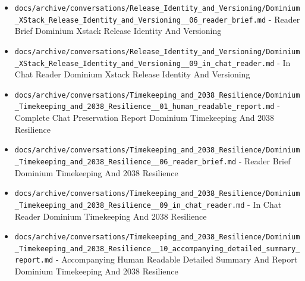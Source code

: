 \documentclass[10.5pt,a4paper,openany]{book}
\begin{document}
\begin{itemize}
\item \texttt{docs/\allowbreak{}archive/\allowbreak{}conversations/\allowbreak{}Release\_\allowbreak{}Identity\_\allowbreak{}and\_\allowbreak{}Versioning/\allowbreak{}Dominium\_\allowbreak{}XStack\_\allowbreak{}Release\_\allowbreak{}Identity\_\allowbreak{}and\_\allowbreak{}Versioning\_\allowbreak{}\_\allowbreak{}06\_\allowbreak{}reader\_\allowbreak{}brief.\allowbreak{}md} -\allowbreak{} Reader Brief Dominium Xstack Release Identity And Versioning
\item \texttt{docs/\allowbreak{}archive/\allowbreak{}conversations/\allowbreak{}Release\_\allowbreak{}Identity\_\allowbreak{}and\_\allowbreak{}Versioning/\allowbreak{}Dominium\_\allowbreak{}XStack\_\allowbreak{}Release\_\allowbreak{}Identity\_\allowbreak{}and\_\allowbreak{}Versioning\_\allowbreak{}\_\allowbreak{}09\_\allowbreak{}in\_\allowbreak{}chat\_\allowbreak{}reader.\allowbreak{}md} -\allowbreak{} In Chat Reader Dominium Xstack Release Identity And Versioning
\item \texttt{docs/\allowbreak{}archive/\allowbreak{}conversations/\allowbreak{}Timekeeping\_\allowbreak{}and\_\allowbreak{}2038\_\allowbreak{}Resilience/\allowbreak{}Dominium\_\allowbreak{}Timekeeping\_\allowbreak{}and\_\allowbreak{}2038\_\allowbreak{}Resilience\_\allowbreak{}\_\allowbreak{}01\_\allowbreak{}human\_\allowbreak{}readable\_\allowbreak{}report.\allowbreak{}md} -\allowbreak{} Complete Chat Preservation Report Dominium Timekeeping And 2038 Resilience
\item \texttt{docs/\allowbreak{}archive/\allowbreak{}conversations/\allowbreak{}Timekeeping\_\allowbreak{}and\_\allowbreak{}2038\_\allowbreak{}Resilience/\allowbreak{}Dominium\_\allowbreak{}Timekeeping\_\allowbreak{}and\_\allowbreak{}2038\_\allowbreak{}Resilience\_\allowbreak{}\_\allowbreak{}06\_\allowbreak{}reader\_\allowbreak{}brief.\allowbreak{}md} -\allowbreak{} Reader Brief Dominium Timekeeping And 2038 Resilience
\item \texttt{docs/\allowbreak{}archive/\allowbreak{}conversations/\allowbreak{}Timekeeping\_\allowbreak{}and\_\allowbreak{}2038\_\allowbreak{}Resilience/\allowbreak{}Dominium\_\allowbreak{}Timekeeping\_\allowbreak{}and\_\allowbreak{}2038\_\allowbreak{}Resilience\_\allowbreak{}\_\allowbreak{}09\_\allowbreak{}in\_\allowbreak{}chat\_\allowbreak{}reader.\allowbreak{}md} -\allowbreak{} In Chat Reader Dominium Timekeeping And 2038 Resilience
\item \texttt{docs/\allowbreak{}archive/\allowbreak{}conversations/\allowbreak{}Timekeeping\_\allowbreak{}and\_\allowbreak{}2038\_\allowbreak{}Resilience/\allowbreak{}Dominium\_\allowbreak{}Timekeeping\_\allowbreak{}and\_\allowbreak{}2038\_\allowbreak{}Resilience\_\allowbreak{}\_\allowbreak{}10\_\allowbreak{}accompanying\_\allowbreak{}detailed\_\allowbreak{}summary\_\allowbreak{}report.\allowbreak{}md} -\allowbreak{} Accompanying Human Readable Detailed Summary And Report Dominium Timekeeping And 2038 Resilience

\end{itemize}
\end{document}
